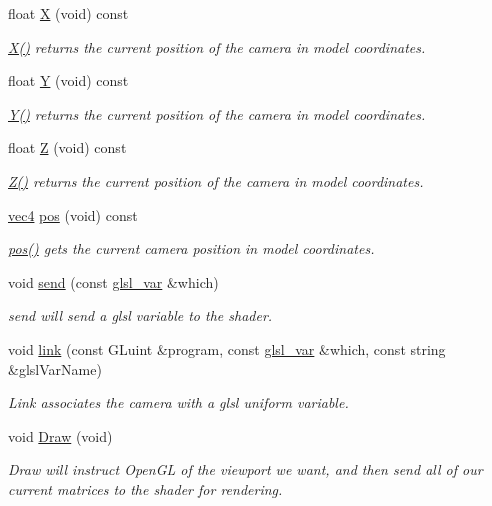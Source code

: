 \begin{DoxyCompactItemize}
float \hyperlink{class_camera_a2f7fd64d5d6e0dfb5edcca53c7d15994}{X} (void) const 
\begin{DoxyCompactList}\small\item\em \hyperlink{class_camera_a2f7fd64d5d6e0dfb5edcca53c7d15994}{X()} returns the current position of the camera in model coordinates. \end{DoxyCompactList}\item 
float \hyperlink{class_camera_a37529ef93871f547ebfd5862bc6cce62}{Y} (void) const 
\begin{DoxyCompactList}\small\item\em \hyperlink{class_camera_a37529ef93871f547ebfd5862bc6cce62}{Y()} returns the current position of the camera in model coordinates. \end{DoxyCompactList}\item 
float \hyperlink{class_camera_abf1730e47e8e51c76acbddcaa85e2475}{Z} (void) const 
\begin{DoxyCompactList}\small\item\em \hyperlink{class_camera_abf1730e47e8e51c76acbddcaa85e2475}{Z()} returns the current position of the camera in model coordinates. \end{DoxyCompactList}\item 
\hyperlink{struct_angel_1_1vec4}{vec4} \hyperlink{class_camera_a9982ac5f48fe0af97fefa725080d6da6}{pos} (void) const 
\begin{DoxyCompactList}\small\item\em \hyperlink{class_camera_a9982ac5f48fe0af97fefa725080d6da6}{pos()} gets the current camera position in model coordinates. \end{DoxyCompactList}\item 
void \hyperlink{class_camera_a36cba68c08136242bf5d906f9c0b610c}{send} (const \hyperlink{class_camera_a6ff726a75a430e4f17e5dec42e4d4405}{glsl\-\_\-var} \&which)
\begin{DoxyCompactList}\small\item\em send will send a glsl variable to the shader. \end{DoxyCompactList}\item 
void \hyperlink{class_camera_ad02f12a279c33e7e85dcaf88830d38c7}{link} (const G\-Luint \&program, const \hyperlink{class_camera_a6ff726a75a430e4f17e5dec42e4d4405}{glsl\-\_\-var} \&which, const string \&glsl\-Var\-Name)
\begin{DoxyCompactList}\small\item\em Link associates the camera with a glsl uniform variable. \end{DoxyCompactList}\item 
void \hyperlink{class_camera_a9d96971546c610e534f603a0f41e32b2}{Draw} (void)
\begin{DoxyCompactList}\small\item\em Draw will instruct Open\-G\-L of the viewport we want, and then send all of our current matrices to the shader for rendering. \end{DoxyCompactList}\end{DoxyCompactItemize}
